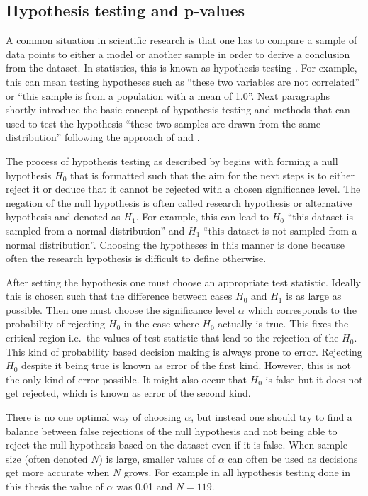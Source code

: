 \documentclass[english, oneside]{HYgradu}
\begin{document}
\subsection{Hypothesis testing and p-values}
A common situation in scientific research is that one has to compare a sample of data points to either a model or another sample in order to derive a conclusion from the dataset. In statistics, this is known as hypothesis testing \citep{wall2003practical}. For example, this can mean testing hypotheses such as ``these two variables are not correlated'' or ``this sample is from a population with a mean of 1.0''. Next paragraphs shortly introduce the basic concept of hypothesis testing and methods that can used to test the hypothesis ``these two samples are drawn from the same distribution'' following the approach of \citet{bohm2010introduction} and \citet{wall2003practical}.

The process of hypothesis testing as described by \citet{bohm2010introduction} begins with forming a null hypothesis $H_0$ that is formatted such that the aim for the next steps is to either reject it or deduce that it cannot be rejected with a chosen significance level. The negation of the null hypothesis is often called research hypothesis or alternative hypothesis and denoted as $H_1$. For example, this can lead to $H_0$ ``this dataset is sampled from a normal distribution'' and $H_1$ ``this dataset is not sampled from a normal distribution''. Choosing the hypotheses in this manner is done because often the research hypothesis is difficult to define otherwise.

After setting the hypothesis one must choose an appropriate test statistic. Ideally this is chosen such that the difference between cases $H_0$ and $H_1$ is as large as possible. Then one must choose 
the significance level $\alpha$ which corresponds to the probability of rejecting $H_0$ in the case where $H_0$ actually is true. This fixes the critical region i.e.\ the values of test statistic that lead to the rejection of the $H_0$. This kind of probability based decision making is always prone to error. Rejecting $H_0$ despite it being true is known as error of the first kind. However, this is not the only kind of error possible. It might also occur that $H_0$ is false but it does not get rejected, which is known as error of the second kind.

There is no one optimal way of choosing $\alpha$, but instead one should try to find a balance between false rejections of the null hypothesis and not being able to reject the null hypothesis based on the dataset even if it is false. When sample size (often denoted $N$) is large, smaller values of $\alpha$ can often be used as decisions get more accurate when $N$ grows. For example in all hypothesis testing done in this thesis the value of $\alpha$ was 0.01 and $N=119$.
\end{document}
